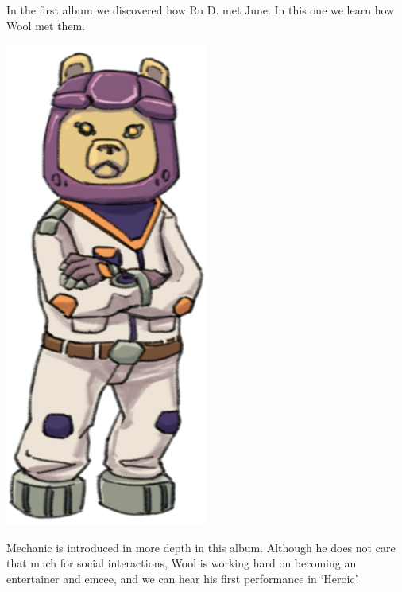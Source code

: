 
In the first album we discovered how Ru D. met June. In this one we learn how Wool met them.

\vspace{.3cm}
\begin{minipage}{0.3\textwidth}
\includegraphics[width=0.5\textwidth]{Assets/woolcrossed}
\end{minipage}
\begin{minipage}{0.7\textwidth}
    Mechanic  is introduced in more depth in this album. Although he does not care that much for social interactions, Wool is working hard on becoming an entertainer and emcee, and we can hear his first performance in `Heroic'.\\
\hfill 
\end{minipage}

